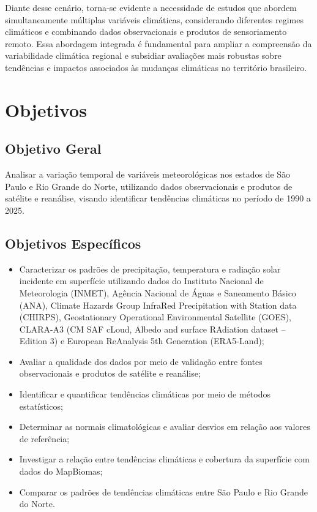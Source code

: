 Diante desse cenário, torna-se evidente a necessidade de estudos que abordem simultaneamente múltiplas variáveis climáticas, considerando diferentes regimes climáticos e combinando dados observacionais e produtos de sensoriamento remoto. Essa abordagem integrada é fundamental para ampliar a compreensão da variabilidade climática regional e subsidiar avaliações mais robustas sobre tendências e impactos associados às mudanças climáticas no território brasileiro.
\newpage
\section{Objetivos}

\subsection{Objetivo Geral}

Analisar a variação temporal de variáveis meteorológicas nos estados de São Paulo e Rio Grande do Norte, utilizando dados observacionais e produtos de satélite e reanálise, visando identificar tendências climáticas no período de 1990 a 2025.

\subsection{Objetivos Específicos}

\begin{itemize}
\item Caracterizar os padrões de precipitação, temperatura e radiação solar incidente 
  em superfície utilizando dados do Instituto Nacional de Meteorologia (INMET), Agência Nacional de Águas e Saneamento Básico (ANA), Climate Hazards Group InfraRed Precipitation with Station data (CHIRPS), Geostationary Operational Environmental Satellite (GOES), CLARA-A3 (CM SAF cLoud, Albedo and surface RAdiation dataset – Edition 3) e European ReAnalysis 5th Generation (ERA5-Land);
\item Avaliar a qualidade dos dados por meio de validação entre fontes observacionais e produtos de satélite e reanálise;
\item Identificar e quantificar tendências climáticas por meio de métodos estatísticos;
\item Determinar as normais climatológicas e avaliar desvios em relação aos valores de referência;
\item Investigar a relação entre tendências climáticas e cobertura da superfície com dados do MapBiomas;
\item Comparar os padrões de tendências climáticas entre São Paulo e Rio Grande do Norte.
\end{itemize}
